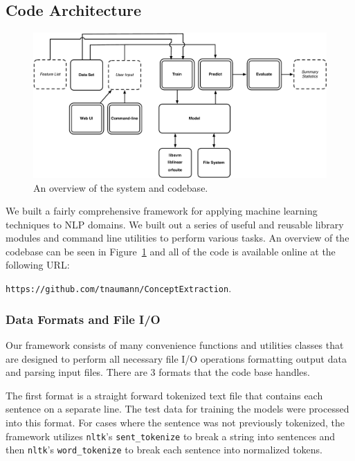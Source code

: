 \documentclass[preprint]{style}
\begin{document}
\subsection{Code Architecture}

\begin{figure}
\begin{center}
	\includegraphics[width=2\columnwidth]{figures/system.pdf}
\end{center}
\caption{An overview of the system and codebase.}
\label{fig:system}
\end{figure}


We built a fairly comprehensive framework for applying machine learning techniques to NLP domains. We built out a series of useful and reusable library modules and command line utilities to perform various tasks. An overview of the codebase can be seen in Figure~\ref{fig:system} and  all of the code is available online at the following URL:

{\tt https://github.com/tnaumann/ConceptExtraction}.

\subsubsection{Data Formats and File I/O}

Our framework consists of many convenience functions and utilities classes that are designed to perform all necessary file I/O operations formatting output data and parsing input files. There are 3 formats that the code base handles. 

The first format is a straight forward tokenized text file that contains each sentence on a separate line. The test data for training the models were processed into this format. For cases where the sentence was not previously tokenized, the framework utilizes {\tt nltk}'s {\tt sent\_tokenize}  to break a string into sentences and then {\tt nltk}'s {\tt word\_tokenize} to break each sentence into normalized tokens.
\end{document}
